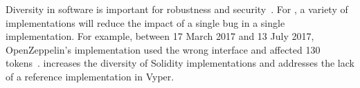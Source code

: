 Diversity in software is important for robustness and security~\cite{FSA97,FHS97}. For \erc, a variety of implementations will reduce the impact of a single bug in a single implementation. For example, between 17 March 2017 and 13 July 2017, OpenZeppelin's implementation used the wrong interface and affected 130 tokens~\cite{ErcBug}. \sys increases the diversity of \erc Solidity implementations and addresses the lack of a reference implementation in Vyper.



%

